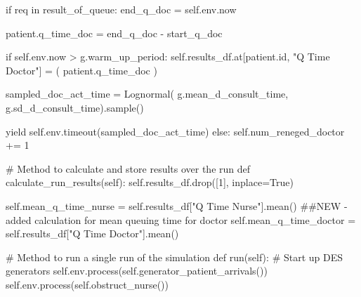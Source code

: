 \documentclass[
  letterpaper,
  DIV=11,
  numbers=noendperiod]{scrreprt}
\newenvironment{Shaded}{\begin{snugshade}}{\end{snugshade}}
\newcommand{\BuiltInTok}[1]{\textcolor[rgb]{0.00,0.23,0.31}{#1}}
\newcommand{\CommentTok}[1]{\textcolor[rgb]{0.37,0.37,0.37}{#1}}
\newcommand{\ControlFlowTok}[1]{\textcolor[rgb]{0.00,0.23,0.31}{#1}}
\newcommand{\DecValTok}[1]{\textcolor[rgb]{0.68,0.00,0.00}{#1}}
\newcommand{\KeywordTok}[1]{\textcolor[rgb]{0.00,0.23,0.31}{#1}}
\newcommand{\NormalTok}[1]{\textcolor[rgb]{0.00,0.23,0.31}{#1}}
\newcommand{\OperatorTok}[1]{\textcolor[rgb]{0.37,0.37,0.37}{#1}}
\newcommand{\StringTok}[1]{\textcolor[rgb]{0.13,0.47,0.30}{#1}}
\newcommand{\VariableTok}[1]{\textcolor[rgb]{0.07,0.07,0.07}{#1}}
\begin{document}
\begin{tcolorbox}
\begin{Shaded}
\begin{Highlighting}[]
                \ControlFlowTok{if}\NormalTok{ req }\KeywordTok{in}\NormalTok{ result\_of\_queue:}
\NormalTok{                    end\_q\_doc }\OperatorTok{=} \VariableTok{self}\NormalTok{.env.now}

\NormalTok{                    patient.q\_time\_doc }\OperatorTok{=}\NormalTok{ end\_q\_doc }\OperatorTok{{-}}\NormalTok{ start\_q\_doc}

                    \ControlFlowTok{if} \VariableTok{self}\NormalTok{.env.now }\OperatorTok{\textgreater{}}\NormalTok{ g.warm\_up\_period:}
                        \VariableTok{self}\NormalTok{.results\_df.at[patient.}\BuiltInTok{id}\NormalTok{, }\StringTok{"Q Time Doctor"}\NormalTok{] }\OperatorTok{=}\NormalTok{ (}
\NormalTok{                            patient.q\_time\_doc}
\NormalTok{                        )}

\NormalTok{                    sampled\_doc\_act\_time }\OperatorTok{=}\NormalTok{ Lognormal(}
\NormalTok{                        g.mean\_d\_consult\_time, g.sd\_d\_consult\_time).sample()}

                    \ControlFlowTok{yield} \VariableTok{self}\NormalTok{.env.timeout(sampled\_doc\_act\_time)}
                \ControlFlowTok{else}\NormalTok{:}
                    \VariableTok{self}\NormalTok{.num\_reneged\_doctor }\OperatorTok{+=} \DecValTok{1}

    \CommentTok{\# Method to calculate and store results over the run}
    \KeywordTok{def}\NormalTok{ calculate\_run\_results(}\VariableTok{self}\NormalTok{):}
        \VariableTok{self}\NormalTok{.results\_df.drop([}\DecValTok{1}\NormalTok{], inplace}\OperatorTok{=}\VariableTok{True}\NormalTok{)}

        \VariableTok{self}\NormalTok{.mean\_q\_time\_nurse }\OperatorTok{=} \VariableTok{self}\NormalTok{.results\_df[}\StringTok{"Q Time Nurse"}\NormalTok{].mean()}
        \CommentTok{\#\#NEW {-} added calculation for mean queuing time for doctor}
        \VariableTok{self}\NormalTok{.mean\_q\_time\_doctor }\OperatorTok{=} \VariableTok{self}\NormalTok{.results\_df[}\StringTok{"Q Time Doctor"}\NormalTok{].mean()}

    \CommentTok{\# Method to run a single run of the simulation}
    \KeywordTok{def}\NormalTok{ run(}\VariableTok{self}\NormalTok{):}
        \CommentTok{\# Start up DES generators}
        \VariableTok{self}\NormalTok{.env.process(}\VariableTok{self}\NormalTok{.generator\_patient\_arrivals())}
        \VariableTok{self}\NormalTok{.env.process(}\VariableTok{self}\NormalTok{.obstruct\_nurse())}


\end{Highlighting}
\end{Shaded}
\end{tcolorbox}
\end{document}
